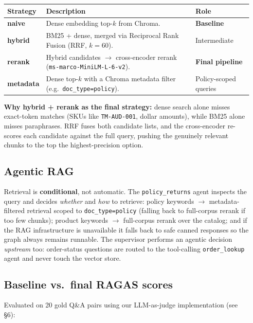 \documentclass[11pt,a4paper]{article}
\newcommand{\code}[1]{\texttt{#1}}
\begin{document}
\begin{tabularx}{\textwidth}{@{}>{\raggedright\arraybackslash}p{1.9cm}Y>{\raggedright\arraybackslash}p{2.6cm}@{}}
\toprule
\textbf{Strategy} & \textbf{Description} & \textbf{Role} \\
\midrule
\textbf{naive}    & Dense embedding top-$k$ from Chroma. & \textbf{Baseline} \\
\textbf{hybrid}   & BM25 + dense, merged via Reciprocal Rank Fusion (RRF, $k{=}60$). & Intermediate \\
\textbf{rerank}   & Hybrid candidates $\to$ cross-encoder rerank (\code{ms-marco-MiniLM-L-6-v2}). & \textbf{Final pipeline} \\
\textbf{metadata} & Dense top-$k$ with a Chroma metadata filter (e.g.\ \code{doc\_type=policy}). & Policy-scoped queries \\
\bottomrule
\end{tabularx}

\textbf{Why hybrid + rerank as the final strategy:} dense search alone misses exact-token matches
(SKUs like \code{TM-AUD-001}, dollar amounts), while BM25 alone misses paraphrases. RRF fuses both
candidate lists, and the cross-encoder re-scores each candidate against the full query, pushing the
genuinely relevant chunks to the top \textemdash{} the highest-precision option.

\subsection{Agentic RAG}
Retrieval is \textbf{conditional}, not automatic. The \code{policy\_returns} agent inspects the
query and decides \emph{whether} and \emph{how} to retrieve: policy keywords $\to$ metadata-filtered
retrieval scoped to \code{doc\_type=policy} (falling back to full-corpus rerank if too few chunks);
product keywords $\to$ full-corpus rerank over the catalog; and if the RAG infrastructure is
unavailable it falls back to safe canned responses so the graph always remains runnable. The
supervisor performs an agentic decision \emph{upstream} too: order-status questions are routed to
the tool-calling \code{order\_lookup} agent and never touch the vector store.

\subsection{Baseline vs.\ final RAGAS scores}
Evaluated on 20 gold Q\&A pairs using our LLM-as-judge implementation (see \S6):
\end{document}
